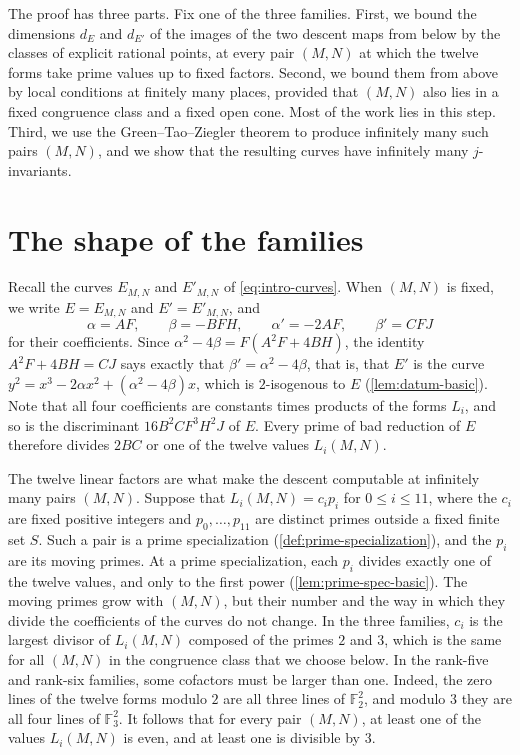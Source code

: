 \documentclass[12pt,oneside,openany]{book}
\theoremstyle{definition}
\theoremstyle{plain}
\numberwithin{equation}{chapter}
\theoremstyle{plain}
\theoremstyle{definition}
\theoremstyle{remark}
\newcommand{\F}{\mathbb F}
\begin{document}
The proof has three parts. Fix one of the three families. First, we bound the dimensions $d_E$ and $d_{E'}$ of the images of the two descent maps from below by the classes of explicit rational points, at every pair $(M,N)$ at which the twelve forms take prime values up to fixed factors. Second, we bound them from above by local conditions at finitely many places, provided that $(M,N)$ also lies in a fixed congruence class and a fixed open cone. Most of the work lies in this step. Third, we use the Green--Tao--Ziegler theorem to produce infinitely many such pairs $(M,N)$, and we show that the resulting curves have infinitely many $j$-invariants.

\section{The shape of the families}\label{sec:overview-shape}

Recall the curves $E_{M,N}$ and $E'_{M,N}$ of \eqref{eq:intro-curves}. When $(M,N)$ is fixed, we write $E=E_{M,N}$ and $E'=E'_{M,N}$, and
\begin{equation*}
\alpha=AF,\qquad\beta=-BFH,\qquad\alpha'=-2AF,\qquad\beta'=CFJ
\end{equation*}
for their coefficients. Since $\alpha^2-4\beta=F(A^2F+4BH)$, the identity $A^2F+4BH=CJ$ says exactly that $\beta'=\alpha^2-4\beta$, that is, that $E'$ is the curve $y^2=x^3-2\alpha x^2+(\alpha^2-4\beta)x$, which is $2$-isogenous to $E$ (\cref{lem:datum-basic}). Note that all four coefficients are constants times products of the forms $L_i$, and so is the discriminant $16B^2CF^3H^2J$ of $E$. Every prime of bad reduction of $E$ therefore divides $2BC$ or one of the twelve values $L_i(M,N)$.

The twelve linear factors are what make the descent computable at infinitely many pairs $(M,N)$. Suppose that $L_i(M,N)=c_ip_i$ for $0\le i\le11$, where the $c_i$ are fixed positive integers and $p_0,\dots,p_{11}$ are distinct primes outside a fixed finite set $S$. Such a pair is a prime specialization (\cref{def:prime-specialization}), and the $p_i$ are its moving primes. At a prime specialization, each $p_i$ divides exactly one of the twelve values, and only to the first power (\cref{lem:prime-spec-basic}). The moving primes grow with $(M,N)$, but their number and the way in which they divide the coefficients of the curves do not change. In the three families, $c_i$ is the largest divisor of $L_i(M,N)$ composed of the primes $2$ and $3$, which is the same for all $(M,N)$ in the congruence class that we choose below. In the rank-five and rank-six families, some cofactors must be larger than one. Indeed, the zero lines of the twelve forms modulo $2$ are all three lines of $\F_2^2$, and modulo $3$ they are all four lines of $\F_3^2$. It follows that for every pair $(M,N)$, at least one of the values $L_i(M,N)$ is even, and at least one is divisible by $3$.
\end{document}
